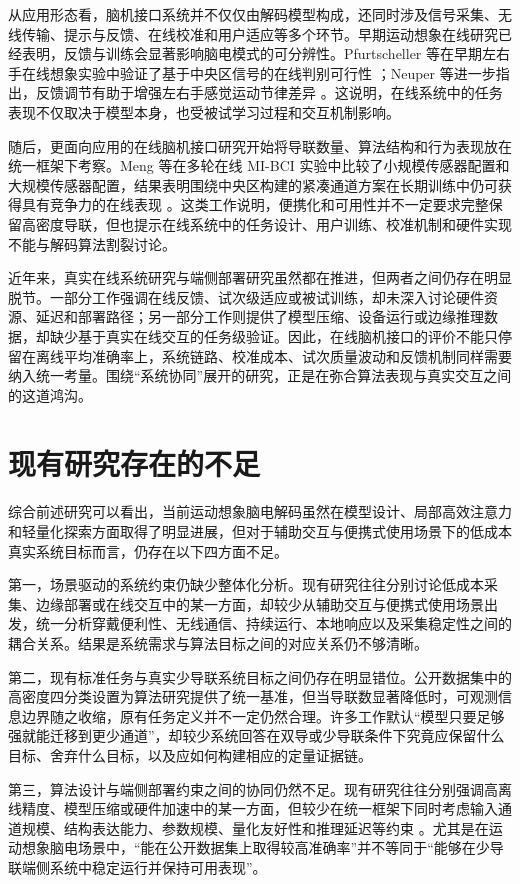 从应用形态看，脑机接口系统并不仅仅由解码模型构成，还同时涉及信号采集、无线传输、提示与反馈、在线校准和用户适应等多个环节。早期运动想象在线研究已经表明，反馈与训练会显著影响脑电模式的可分辨性。Pfurtscheller 等在早期左右手在线想象实验中验证了基于中央区信号的在线判别可行性 \cite{Pfu97}；Neuper 等进一步指出，反馈调节有助于增强左右手感觉运动节律差异 \cite{Neu99}。这说明，在线系统中的任务表现不仅取决于模型本身，也受被试学习过程和交互机制影响。

随后，更面向应用的在线脑机接口研究开始将导联数量、算法结构和行为表现放在统一框架下考察。Meng 等在多轮在线 MI-BCI 实验中比较了小规模传感器配置和大规模传感器配置，结果表明围绕中央区构建的紧凑通道方案在长期训练中仍可获得具有竞争力的在线表现 \cite{Men18}。这类工作说明，便携化和可用性并不一定要求完整保留高密度导联，但也提示在线系统中的任务设计、用户训练、校准机制和硬件实现不能与解码算法割裂讨论。

近年来，真实在线系统研究与端侧部署研究虽然都在推进，但两者之间仍存在明显脱节。一部分工作强调在线反馈、试次级适应或被试训练，却未深入讨论硬件资源、延迟和部署路径；另一部分工作则提供了模型压缩、设备运行或边缘推理数据，却缺少基于真实在线交互的任务级验证。因此，在线脑机接口的评价不能只停留在离线平均准确率上，系统链路、校准成本、试次质量波动和反馈机制同样需要纳入统一考量。围绕“系统协同”展开的研究，正是在弥合算法表现与真实交互之间的这道鸿沟。

\section{现有研究存在的不足}

综合前述研究可以看出，当前运动想象脑电解码虽然在模型设计、局部高效注意力和轻量化探索方面取得了明显进展，但对于辅助交互与便携式使用场景下的低成本真实系统目标而言，仍存在以下四方面不足。

第一，场景驱动的系统约束仍缺少整体化分析。现有研究往往分别讨论低成本采集、边缘部署或在线交互中的某一方面，却较少从辅助交互与便携式使用场景出发，统一分析穿戴便利性、无线通信、持续运行、本地响应以及采集稳定性之间的耦合关系。结果是系统需求与算法目标之间的对应关系仍不够清晰。

第二，现有标准任务与真实少导联系统目标之间仍存在明显错位。公开数据集中的高密度四分类设置为算法研究提供了统一基准，但当导联数显著降低时，可观测信息边界随之收缩，原有任务定义并不一定仍然合理。许多工作默认“模型只要足够强就能迁移到更少通道”，却较少系统回答在双导或少导联条件下究竟应保留什么目标、舍弃什么目标，以及应如何构建相应的定量证据链。

第三，算法设计与端侧部署约束之间的协同仍然不足。现有研究往往分别强调高离线精度、模型压缩或硬件加速中的某一方面，但较少在统一框架下同时考虑输入通道规模、结构表达能力、参数规模、量化友好性和推理延迟等约束 \cite{keu2024compact, wan2023novel, hua2023improved}。尤其是在运动想象脑电场景中，“能在公开数据集上取得较高准确率”并不等同于“能够在少导联端侧系统中稳定运行并保持可用表现”。

